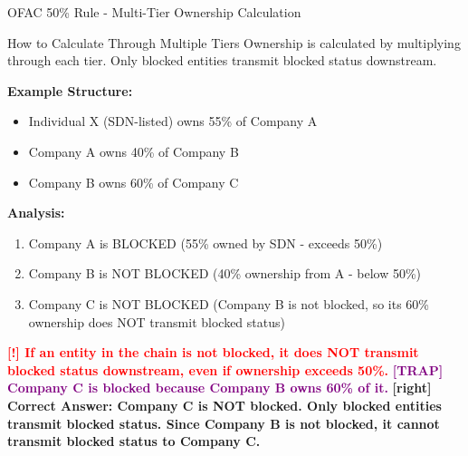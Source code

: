 \documentclass[11pt,a4paper]{beamer}
\newcommand{\redflag}[1]{\textcolor{red}{\textbf{[!] #1}}}
\newcommand{\trap}[1]{\textcolor{purple}{\textbf{[TRAP] #1}}}
\newcommand{\correct}[1]{\textcolor{green!50!black}{\textbf{[right] #1}}}
\begin{document}
\begin{frame}{OFAC 50\% Rule - Multi-Tier Ownership Calculation}
\begin{block}{How to Calculate Through Multiple Tiers}
Ownership is calculated by multiplying through each tier. Only blocked entities transmit blocked status downstream.
\end{block}
\textbf{Example Structure:}
\begin{itemize}
\item Individual X (SDN-listed) owns 55\% of Company A
\item Company A owns 40\% of Company B
\item Company B owns 60\% of Company C
\end{itemize}
\textbf{Analysis:}
\begin{enumerate}
\item Company A is BLOCKED (55\% owned by SDN - exceeds 50\%)
\item Company B is NOT BLOCKED (40\% ownership from A - below 50\%)
\item Company C is NOT BLOCKED (Company B is not blocked, so its 60\% ownership does NOT transmit blocked status)
\end{enumerate}
\redflag{If an entity in the chain is not blocked, it does NOT transmit blocked status downstream, even if ownership exceeds 50\%.}
\trap{Company C is blocked because Company B owns 60\% of it.}
\correct{Correct Answer: Company C is NOT blocked. Only blocked entities transmit blocked status. Since Company B is not blocked, it cannot transmit blocked status to Company C.}
\end{frame}

\end{document}
